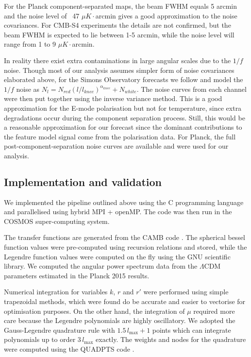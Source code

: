 For the Planck component-separated maps, the beam FWHM equals 5 arcmin and the noise level of ~47 $\mu K \cdot $arcmin gives a good approximation to the noise covariances. For CMB-S4 experiments the details are not confirmed, but the beam FWHM is expected to lie between 1-5 arcmin, while the noise level will range from 1 to 9 $\mu K \cdot $arcmin. \cite{Abazajian2016}

In reality there exist extra contaminations in large angular scales due to the $1/f$ noise. Though most of our analysis assumes simpler form of noise covariances elaborated above, for the Simons Observatory forecasts we follow \cite{TheSimonsObservatoryCollaboration2018} and model the $1/f$ noise as {$N_l = N_{red} (l/l_{knee})^{\alpha_{knee}} + N_{white}$}. The noise curves from each channel were then put together using the inverse variance method. This is a good approximation for the E-mode polarisation but not for temperature, since extra degradations occur during the component separation process. Still, this would be a reasonable approximation for our forecast since the dominant contributions to the feature model signal come from the polarisation data. For Planck, the full post-component-separation noise curves are available and were used for our analysis. 



\subsection{Implementation and validation}

We implemented the pipeline outlined above using the C programming language and parallelised using hybrid MPI + openMP. The code was then run in the COSMOS super-computing system.

The transfer functions are generated from the CAMB code \cite{Lewis2000}. The spherical bessel function values were pre-computed using recursion relations and stored, while the Legendre function values were computed on the fly using the GNU scientific library. We computed the angular power spectrum data from the $\Lambda$CDM parameters estimated in the Planck 2015 results. 

Numerical integration for variables $k$, $r$ and $r'$ were performed using simple trapezoidal methods, which were found do be accurate and easier to vectorise for optimisation purposes. On the other hand, the integration of $\mu$ required more care because the Legendre polynomials are highly oscillatory. We adopted the Gauss-Legendre quadrature rule with $1.5 \,l_\text{max}+1$ points which can integrate polynomials up to order $3\,l_\text{max}$ exactly. The weights and nodes for the quadrature were computed using the QUADPTS code \cite{Hale2013}.


